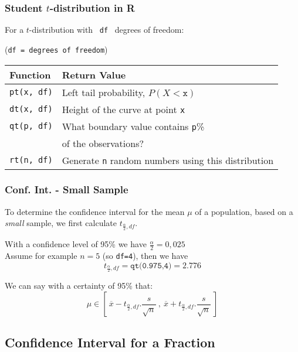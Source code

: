 \documentclass[aspectratio=169]{beamer}
\begin{document}
\begin{frame}
  \frametitle{Student $t$-distribution in R}
  
  For a $t$-distribution with ~\texttt{df}~ degrees of freedom:
  
  \small (\texttt{df = degrees of freedom})
  \vfill
  \centering
  \begin{tabular}{ll}
    \textbf{Function}  & \textbf{Return Value}                       \\
    \hline
    \texttt{pt(x, df)} & Left tail probability, $P(X<\mathtt{x})$    \\
    \texttt{dt(x, df)} & Height of the curve at point \texttt{x}     \\
    \texttt{qt(p, df)} & What boundary value contains \texttt{p}\%   \\
                       & of the observations?                        \\
    \texttt{rt(n, df)} & Generate \texttt{n} random numbers using this distribution \\
  \end{tabular}
  
\end{frame}

\begin{frame}
  \frametitle{Conf. Int. - Small Sample}
  To determine the confidence interval for the mean $\mu$ of a population, based on a \textit{small} sample, we first calculate $t_ {\frac{\alpha}{2},df}$.
  
  \vfill
  With a confidence level of 95\% we have $\frac{\alpha}{2}=0,025$\\
  Assume for example $n=5$ (so \texttt{df=4}), then we have
  \[ t_ {\frac{\alpha}{2},df} = \texttt{qt(0.975,4)} = 2.776 \]
  
  \vfill
  We can say with a certainty of 95\% that:
  \[ \mu \in \left[~ \overline{x} - t_{\frac{\alpha}{2},df}.\frac{s}{\sqrt{n}} ~,~ \overline{x} + t_{\frac{\alpha}{2},df}.\frac{s}{\sqrt{n}} ~\right] \]
  
\end{frame}


\subsection{Confidence Interval for a Fraction}
\end{document}
